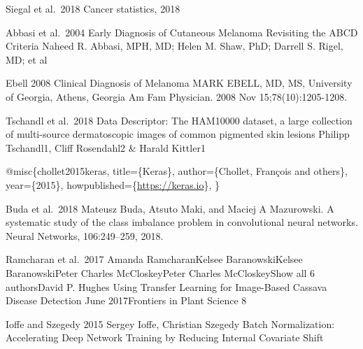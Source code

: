 \documentclass[11pt]{article}
\begin{document}
Siegal et al.~2018 Cancer statistics, 2018

Abbasi et al.~2004 Early Diagnosis of Cutaneous Melanoma Revisiting the
ABCD Criteria Naheed R. Abbasi, MPH, MD; Helen M. Shaw, PhD; Darrell S.
Rigel, MD; et al

Ebell 2008 Clinical Diagnosis of Melanoma MARK EBELL, MD, MS, University
of Georgia, Athens, Georgia Am Fam Physician. 2008 Nov
15;78(10):1205-1208.

Tschandl et al.~2018 Data Descriptor: The HAM10000 dataset, a large
collection of multi-source dermatoscopic images of common pigmented skin
lesions Philipp Tschandl1, Cliff Rosendahl2 \& Harald Kittler1

@misc\{chollet2015keras, title=\{Keras\}, author=\{Chollet, Fran\c{c}ois
and others\}, year=\{2015\}, howpublished=\{\url{https://keras.io}\}, \}

Buda et al.~2018 Mateusz Buda, Atsuto Maki, and Maciej A Mazurowski. A
systematic study of the class imbalance problem in convolutional neural
networks. Neural Networks, 106:249--259, 2018.

Ramcharan et al.~2017 Amanda RamcharanKelsee BaranowskiKelsee
BaranowskiPeter Charles McCloskeyPeter Charles McCloskeyShow all 6
authorsDavid P. Hughes Using Transfer Learning for Image-Based Cassava
Disease Detection June 2017Frontiers in Plant Science 8

Ioffe and Szegedy 2015 Sergey Ioffe, Christian Szegedy Batch
Normalization: Accelerating Deep Network Training by Reducing Internal
Covariate Shift


    
    
    
    
\end{document}
